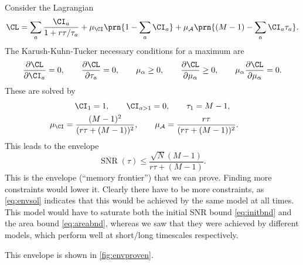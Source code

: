 \documentclass[12pt]{article}
\DeclareMathOperator{\snr}{SNR}
\newcommand{\snrb}{\overline{\snr}}
\newcommand{\CA}{\mathcal{A}}
\renewcommand{\pdiff}[2]{\frac{\partial #1}{\partial #2}}
\begin{document}
Consider the Lagrangian
%
\begin{equation}\label{eq:envlagrangian}
  \CL = \sum_a \frac{\CI_a}{1+r\tau/\tau_a} + \mu_\CI \prn{1 - \sum_a \CI_a} + \mu_\CA \prn{(M-1) - \sum_a \CI_a \tau_a}.
\end{equation}
%
The Karush-Kuhn-Tucker necessary conditions for a maximum are
%
\begin{equation}\label{eq:envKTcond}
  \pdiff{\CL}{\CI_a} = 0, \qquad
  \pdiff{\CL}{\tau_a} = 0, \qquad
  \mu_\alpha \geq 0, \qquad
  \pdiff{\CL}{\mu_\alpha} \geq 0, \qquad
  \mu_\alpha\pdiff{\CL}{\mu_\alpha} = 0.
\end{equation}
%
These are solved by
%
\begin{equation}\label{eq:envsol}
\begin{gathered}
  \CI_1 = 1, \qquad
  \CI_{a>1} = 0, \qquad
  \tau_1 = M-1, \\
  \mu_\CI = \frac{(M-1)^2}{(r\tau + (M-1))^2}, \qquad
  \mu_\CA = \frac{r\tau}{(r\tau+(M-1))^2}. \qquad
\end{gathered}
\end{equation}
%
This leads to the envelope
%
\begin{equation}\label{eq:env}
  \snrb(\tau) \leq \frac{\sqrt{N}(M-1)}{r\tau + (M-1)}.
\end{equation}
%
This is the envelope (``memory frontier'') that we can prove.
Finding more constraints would lower it.
Clearly there have to be more constraints, as \eqref{eq:envsol} indicates that this would be achieved by the same model at all times.
This model would have to saturate both the initial SNR bound \eqref{eq:initbnd} and the area bound \eqref{eq:areabnd}, whereas we saw that they were achieved by different models, which perform well at short/long timescales respectively.

This envelope is shown in \autoref{fig:envproven}.
\end{document}

